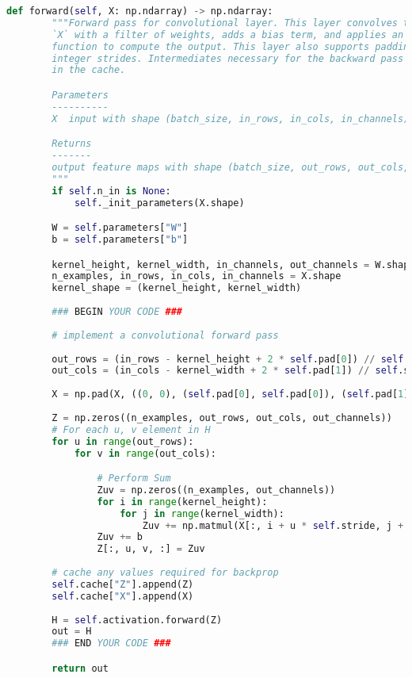 \begin{lstlisting}[language=Python]
    def forward(self, X: np.ndarray) -> np.ndarray:
        """Forward pass for convolutional layer. This layer convolves the input
        `X` with a filter of weights, adds a bias term, and applies an activation
        function to compute the output. This layer also supports padding and
        integer strides. Intermediates necessary for the backward pass are stored
        in the cache.

        Parameters
        ----------
        X  input with shape (batch_size, in_rows, in_cols, in_channels)

        Returns
        -------
        output feature maps with shape (batch_size, out_rows, out_cols, out_channels)
        """
        if self.n_in is None:
            self._init_parameters(X.shape)

        W = self.parameters["W"]
        b = self.parameters["b"]

        kernel_height, kernel_width, in_channels, out_channels = W.shape
        n_examples, in_rows, in_cols, in_channels = X.shape
        kernel_shape = (kernel_height, kernel_width)
        
        ### BEGIN YOUR CODE ###
        
        # implement a convolutional forward pass
        
        out_rows = (in_rows - kernel_height + 2 * self.pad[0]) // self.stride + 1
        out_cols = (in_cols - kernel_width + 2 * self.pad[1]) // self.stride + 1
        
        X = np.pad(X, ((0, 0), (self.pad[0], self.pad[0]), (self.pad[1], self.pad[1]), (0, 0)))
        
        Z = np.zeros((n_examples, out_rows, out_cols, out_channels))
        # For each u, v element in H
        for u in range(out_rows):
            for v in range(out_cols):

                # Perform Sum
                Zuv = np.zeros((n_examples, out_channels))
                for i in range(kernel_height):
                    for j in range(kernel_width):
                        Zuv += np.matmul(X[:, i + u * self.stride, j + v * self.stride, :], W[i, j, :, :])
                Zuv += b
                Z[:, u, v, :] = Zuv
        
        # cache any values required for backprop
        self.cache["Z"].append(Z)
        self.cache["X"].append(X)
        
        H = self.activation.forward(Z)
        out = H
        ### END YOUR CODE ###

        return out

\end{lstlisting}

